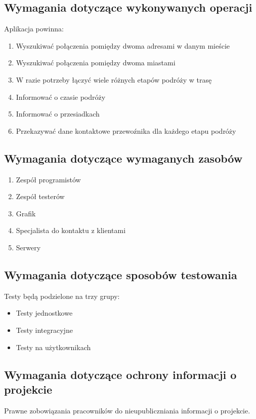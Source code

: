 \documentclass[12pt,a4paper]{report}
\begin{document}
\subsection{Wymagania dotyczące wykonywanych operacji}
	Aplikacja powinna:
	\begin{enumerate}	
		\item Wyszukiwać połączenia pomiędzy dwoma adresami w danym mieście
		\item Wyszukiwać połączenia pomiędzy dwoma miastami
		\item W razie potrzeby łączyć wiele różnych etapów podróży w trasę
		\item Informować o czasie podróży
		\item Informować o przesiadkach
		\item Przekazywać dane kontaktowe przewoźnika dla każdego etapu podróży 
	\end{enumerate}
\subsection{Wymagania dotyczące wymaganych zasobów}
\begin{enumerate}
	\item Zespół programistów
	\item Zespół testerów
	\item Grafik
	\item Specjalista do kontaktu z klientami
	\item Serwery
\end{enumerate}
\subsection{Wymagania dotyczące sposobów testowania}
Testy będą podzielone na trzy grupy:
\begin{itemize}
	\item Testy jednostkowe
	\item Testy integracyjne
	\item Testy na użytkownikach
\end{itemize}
\subsection{Wymagania dotyczące ochrony informacji o projekcie}
	Prawne zobowiązania pracowników do nieupubliczniania informacji o projekcie.
\end{document}
